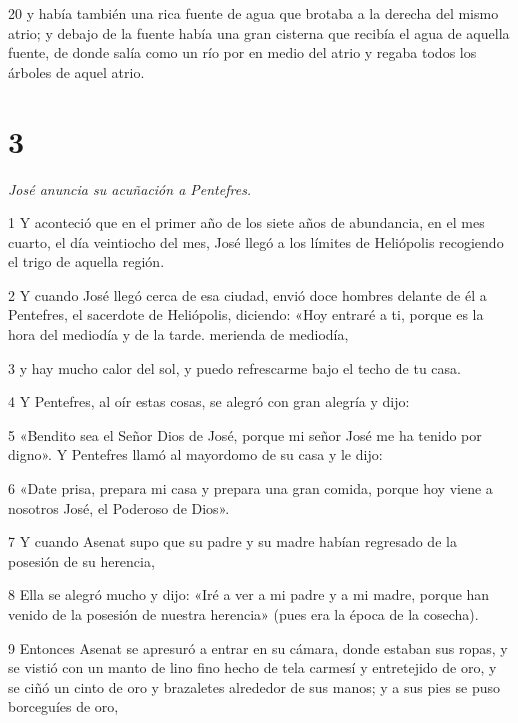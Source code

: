 \par 20 y había también una rica fuente de agua que brotaba a la derecha del mismo atrio; y debajo de la fuente había una gran cisterna que recibía el agua de aquella fuente, de donde salía como un río por en medio del atrio y regaba todos los árboles de aquel atrio.

\chapter{3}

\textit{José anuncia su acuñación a Pentefres.}

\par 1 Y aconteció que en el primer año de los siete años de abundancia, en el mes cuarto, el día veintiocho del mes, José llegó a los límites de Heliópolis recogiendo el trigo de aquella región.

\par 2 Y cuando José llegó cerca de esa ciudad, envió doce hombres delante de él a Pentefres, el sacerdote de Heliópolis, diciendo: «Hoy entraré a ti, porque es la hora del mediodía y de la tarde. merienda de mediodía,

\par 3 y hay mucho calor del sol, y puedo refrescarme bajo el techo de tu casa.

\par 4 Y Pentefres, al oír estas cosas, se alegró con gran alegría y dijo:

\par 5 «Bendito sea el Señor Dios de José, porque mi señor José me ha tenido por digno». Y Pentefres llamó al mayordomo de su casa y le dijo:

\par 6 «Date prisa, prepara mi casa y prepara una gran comida, porque hoy viene a nosotros José, el Poderoso de Dios».

\par 7 Y cuando Asenat supo que su padre y su madre habían regresado de la posesión de su herencia,

\par 8 Ella se alegró mucho y dijo: «Iré a ver a mi padre y a mi madre, porque han venido de la posesión de nuestra herencia» (pues era la época de la cosecha).

\par 9 Entonces Asenat se apresuró a entrar en su cámara, donde estaban sus ropas, y se vistió con un manto de lino fino hecho de tela carmesí y entretejido de oro, y se ciñó un cinto de oro y brazaletes alrededor de sus manos; y a sus pies se puso borceguíes de oro,


